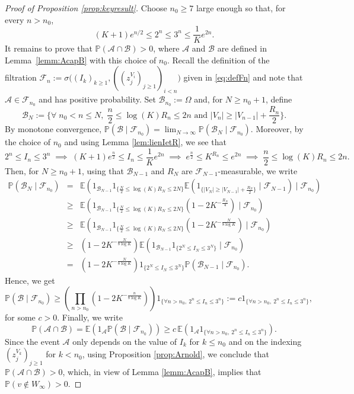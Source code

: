 \documentclass[french]{article}
\newcommand{\zi}{z}
\newcommand{\E}{\mathbb{E}}
\renewcommand{\P}{\mathbb{P}}
\renewcommand{\1}{\mathds{1}}
\begin{document}
\begin{proof}[Proof of Proposition \ref{prop:keyresult}] Choose $n_0\ge 7$ large enough so that, for every $n>n_0$,
$$(K+1)e^{n/2}\le 2^n\le 3^n\le \frac{1}{K}e^{2n}.$$
It remains to prove that $\P(\mathcal{A}\cap \mathcal{B})>0$, where $\mathcal A$ and $\mathcal B$ are defined in Lemma~\ref{lemm:AcapB} with this choice of $n_0$. Recall the definition of the filtration $\mathcal{F}_n:=\sigma\bigl((I_k)_{k\ge 1}, ((\zi_j^{V_i})_{j\ge 1})_{i< n}\bigr)$ given in \eqref{eq:defFn} and note that $\mathcal{A}\in \mathcal{F}_{n_0}$ and has positive probability. Set $\mathcal{B}_{n_0}:=\Omega$ and, for $N\ge n_0+1$, define
$$\mathcal{B}_N:=\Big\{\forall \; n_0< n\le N,\; \frac{n}{2}\le \log(K)R_n \le 2n \mbox{ and } |V_n|\ge |V_{n-1}|+\frac{R_n}{2}\Big\}.$$
By monotone convergence, $\P(\mathcal{B}\mid \mathcal{F}_{n_0})=\lim_{N\to \infty} \P(\mathcal{B}_N\mid \mathcal{F}_{n_0})$. Moreover, by the choice of $n_0$ and using Lemma \ref{lem:lienIetR}, we see that 
$$2^n\le I_n\le 3^n \;\implies\; (K+1) e^{\frac{n}{2}}\le I_n \le \frac{1}{K}e^{2n} \;\implies\; e^{\frac{n}{2}}\le K^{R_n} \le e^{2n} \;\implies\; \frac{n}{2}\le \log(K)R_n \le 2n.$$
Then, for $N\ge n_0+1$, using that $\mathcal{B}_{N-1}$ and $R_N$ are $\mathcal{F}_{N-1}$-measurable, we write
\begin{eqnarray*}
    \P(\mathcal{B}_N\mid \mathcal{F}_{n_0})&=&\E(1_{\mathcal{B}_{N-1}}1_{\{\frac{N}{2}\le \log(K)R_N \le 2N\}}\E(1_{\{|V_N|\ge |V_{N-1}|+\frac{R_N}{2}\}}\mid\mathcal{F}_{N-1}) \mid \mathcal{F}_{n_0}) \\
    &\ge & \E(1_{\mathcal{B}_{N-1}}1_{\{\frac{N}{2}\le \log(K)R_N \le 2N\}}(1-2K^{-\frac{R_{N}}{4}}) \mid \mathcal{F}_{n_0})\\
     &\ge & \E(1_{\mathcal{B}_{N-1}}1_{\{\frac{N}{2}\le \log(K)R_N \le 2N\}}(1-2K^{-\frac{N}{8\log K}}) \mid \mathcal{F}_{n_0})\\
     &\ge & (1-2K^{-\frac{N}{8\log K}})\E(1_{\mathcal{B}_{N-1}}1_{\{2^N\le I_N \le 3^N\}} \mid \mathcal{F}_{n_0})\\
  &=& (1-2K^{-\frac{N}{8\log K}}) 1_{\{2^N\le I_N \le 3^N\}}\P(\mathcal{B}_{N-1}\mid \mathcal{F}_{n_0}).
\end{eqnarray*}
Hence, we get 
$$\P(\mathcal{B}\mid \mathcal{F}_{n_0})\ge \left(\prod_{n>n_0}(1-2K^{-\frac{n}{8\log K}}) \right)1_{\{\forall n>n_0,\ 2^n\le I_n \le 3^n\} }:=c1_{\{\forall n>n_0,\ 2^n\le I_n \le 3^n\} },$$
for some $c>0$. Finally, we write 
 $$\P(\mathcal{A}\cap \mathcal{B})=\E(1_{\mathcal{A}} \P(\mathcal{B}\mid \mathcal{F}_{n_0}))\ge c \,\E(1_{\mathcal{A}}1_{\{\forall n>n_0,\ 2^n\le I_n \le 3^n\} }).$$
Since the event $\mathcal{A}$ only depends on the value of $I_k$ for $k\le n_0$ and on the indexing $(\zi_j^{V_k})_{j\ge 1}$ for $k<n_0$, using Proposition \ref{prop:Arnold}, we conclude that 
$\P(\mathcal{A}\cap \mathcal{B})>0$, which, in view of Lemma \ref{lemm:AcapB}, implies that $\P(v\notin W_\infty)>0$.
\end{proof}
\end{document}
